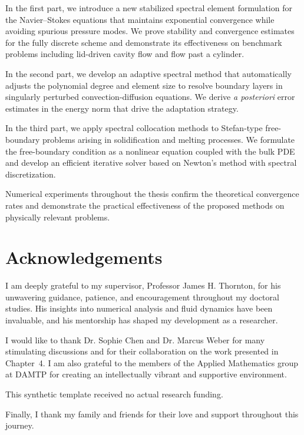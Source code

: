 \documentclass[12pt,a4paper,oneside]{report}
\begin{document}
In the first part, we introduce a new stabilized spectral element formulation for the Navier--Stokes equations that maintains exponential convergence while avoiding spurious pressure modes. We prove stability and convergence estimates for the fully discrete scheme and demonstrate its effectiveness on benchmark problems including lid-driven cavity flow and flow past a cylinder.

In the second part, we develop an adaptive spectral method that automatically adjusts the polynomial degree and element size to resolve boundary layers in singularly perturbed convection-diffusion equations. We derive \textit{a posteriori} error estimates in the energy norm that drive the adaptation strategy.

In the third part, we apply spectral collocation methods to Stefan-type free-boundary problems arising in solidification and melting processes. We formulate the free-boundary condition as a nonlinear equation coupled with the bulk PDE and develop an efficient iterative solver based on Newton's method with spectral discretization.

Numerical experiments throughout the thesis confirm the theoretical convergence rates and demonstrate the practical effectiveness of the proposed methods on physically relevant problems.

\chapter*{Acknowledgements}

I am deeply grateful to my supervisor, Professor James H. Thornton, for his unwavering guidance, patience, and encouragement throughout my doctoral studies. His insights into numerical analysis and fluid dynamics have been invaluable, and his mentorship has shaped my development as a researcher.

I would like to thank Dr. Sophie Chen and Dr. Marcus Weber for many stimulating discussions and for their collaboration on the work presented in Chapter~4. I am also grateful to the members of the Applied Mathematics group at DAMTP for creating an intellectually vibrant and supportive environment.

This synthetic template received no actual research funding.

Finally, I thank my family and friends for their love and support throughout this journey.

\tableofcontents
\listoffigures
\listoftables
\end{document}
